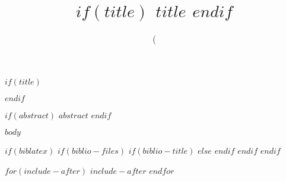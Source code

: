\documentclass[12pt, letter]{article} %
\title{
$if(title)$
	$title$
$endif$
} %
\author{\authorstyle{$for(author)$$author$$sep$$endfor$}} %
\date($date$)
\begin{document}
$if(title)$
	\maketitle %
$endif$

\thispagestyle{firstpage} %


$if(abstract)$
	\textbf{$abstract$}
$endif$


$body$


$if(biblatex)$
	$if(biblio-files)$
		$if(biblio-title)$
			\printbibliography[title={$biblio-title$}] %
		$else$
			\printbibliography[title={Bibliography}] %
		$endif$
	$endif$
$endif$

$for(include-after)$
	$include-after$
$endfor$

\end{document}

